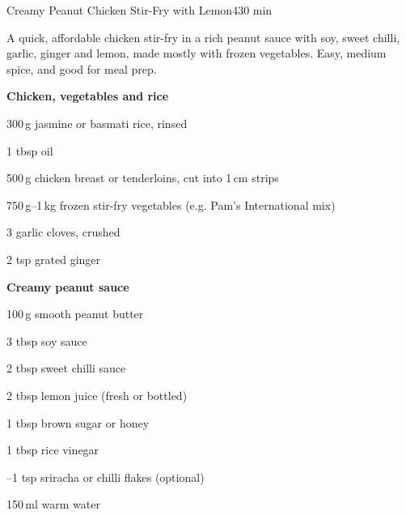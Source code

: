 \begin{recipebox}{Creamy Peanut Chicken Stir-Fry with Lemon}{4}{30 min}

A quick, affordable chicken stir-fry in a rich peanut sauce with soy, sweet
chilli, garlic, ginger and lemon, made mostly with frozen vegetables. Easy,
medium spice, and good for meal prep.

\begin{ingredients}
  \item[] \textbf{Chicken, vegetables and rice}
  \item 300\,g jasmine or basmati rice, rinsed
  \item 1 tbsp oil
  \item 500\,g chicken breast or tenderloins, cut into 1\,cm strips
  \item 750\,g--1\,kg frozen stir-fry vegetables (e.g. Pam's International mix)
  \item 3 garlic cloves, crushed
  \item 2 tsp grated ginger
  \item[] \textbf{Creamy peanut sauce}
  \item 100\,g smooth peanut butter
  \item 3 tbsp soy sauce
  \item 2 tbsp sweet chilli sauce
  \item 2 tbsp lemon juice (fresh or bottled)
  \item 1 tbsp brown sugar or honey
  \item 1 tbsp rice vinegar
  \item {}--1 tsp sriracha or chilli flakes (optional)
  \item 150\,ml warm water
\end{ingredients}


\end{recipebox}
